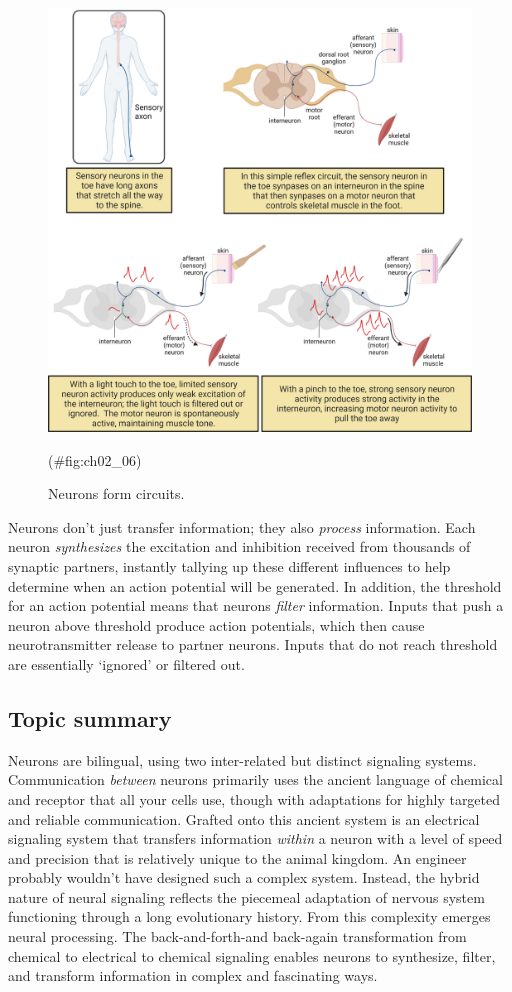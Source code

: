 \documentclass[
]{book}
\begin{document}
\begin{figure}

{\centering \includegraphics[width=0.8\linewidth]{images/ch02/02_06} 

}

\caption{Neurons form circuits.}(\#fig:ch02_06)
\end{figure}

Neurons don't just transfer information; they also \emph{process} information. Each neuron \emph{synthesizes} the excitation and inhibition received from thousands of synaptic partners, instantly tallying up these different influences to help determine when an action potential will be generated. In addition, the threshold for an action potential means that neurons \emph{filter} information. Inputs that push a neuron above threshold produce action potentials, which then cause neurotransmitter release to partner neurons. Inputs that do not reach threshold are essentially `ignored' or filtered out.

\hypertarget{topic-summary}{%
\subsection{Topic summary}\label{topic-summary}}

Neurons are bilingual, using two inter-related but distinct signaling systems. Communication \emph{between} neurons primarily uses the ancient language of chemical and receptor that all your cells use, though with adaptations for highly targeted and reliable communication. Grafted onto this ancient system is an electrical signaling system that transfers information \emph{within} a neuron with a level of speed and precision that is relatively unique to the animal kingdom. An engineer probably wouldn't have designed such a complex system. Instead, the hybrid nature of neural signaling reflects the piecemeal adaptation of nervous system functioning through a long evolutionary history. From this complexity emerges neural processing. The back-and-forth-and back-again transformation from chemical to electrical to chemical signaling enables neurons to synthesize, filter, and transform information in complex and fascinating ways.
\end{document}
